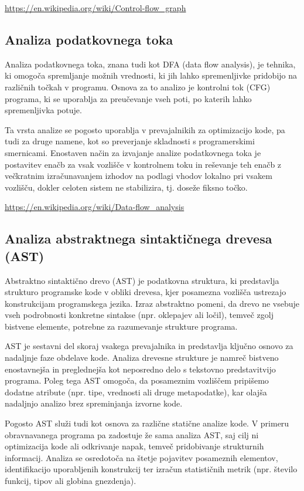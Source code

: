\documentclass[a4paper,12pt,openright]{book}
\begin{document}
\url{https://en.wikipedia.org/wiki/Control-flow_graph}

\subsection{Analiza podatkovnega toka}

Analiza podatkovnega toka, znana tudi kot DFA (data flow analysis), je tehnika, ki omogoča spremljanje možnih vrednosti, ki jih lahko spremenljivke pridobijo na različnih točkah v programu. Osnova za to analizo je kontrolni tok (CFG) programa, ki se uporablja za preučevanje vseh poti, po katerih lahko spremenljivka potuje.

Ta vrsta analize se pogosto uporablja v prevajalnikih za optimizacijo kode, pa tudi za druge namene, kot so preverjanje skladnosti s programerskimi smernicami. Enostaven način za izvajanje analize podatkovnega toka je postavitev enačb za vsak vozlišče v kontrolnem toku in reševanje teh enačb z večkratnim izračunavanjem izhodov na podlagi vhodov lokalno pri vsakem vozlišču, dokler celoten sistem ne stabilizira, tj. doseže fiksno točko.

\url{https://en.wikipedia.org/wiki/Data-flow_analysis}

\subsection{Analiza abstraktnega sintaktičnega drevesa (AST)}

Abstraktno sintaktično drevo (AST) je podatkovna struktura, ki predstavlja strukturo programske kode v obliki drevesa, kjer posamezna vozlišča ustrezajo konstrukcijam programskega jezika. Izraz abstraktno pomeni, da drevo ne vsebuje vseh podrobnosti konkretne sintakse (npr. oklepajev ali ločil), temveč zgolj bistvene elemente, potrebne za razumevanje strukture programa.

AST je sestavni del skoraj vsakega prevajalnika in predstavlja ključno osnovo za nadaljnje faze obdelave kode. Analiza drevesne strukture je namreč bistveno enostavnejša in preglednejša kot neposredno delo s tekstovno predstavitvijo programa. Poleg tega AST omogoča, da posameznim vozliščem pripišemo dodatne atribute (npr. tipe, vrednosti ali druge metapodatke), kar olajša nadaljnjo analizo brez spreminjanja izvorne kode.

Pogosto AST služi tudi kot osnova za različne statične analize kode. V primeru obravnavanega programa pa zadostuje že sama analiza AST, saj cilj ni optimizacija kode ali odkrivanje napak, temveč pridobivanje strukturnih informacij. Analiza se osredotoča na štetje pojavitev posameznih elementov, identifikacijo uporabljenih konstrukcij ter izračun statističnih metrik (npr. število funkcij, tipov ali globina gnezdenja).
\end{document}
